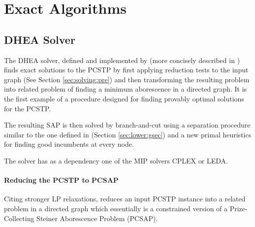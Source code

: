 \clearpage
\section{Exact Algorithms}\label{sec:solving:exact}

\subsection{DHEA Solver}
\label{sec:exact:dhea}
The DHEA solver, defined and implemented
by \citet{ljubic2005solving}
(more concisely described in \citet{ljubic2006algorithmic}) finds exact solutions to the PCSTP
by first applying
reduction tests to the input graph (See Section \ref{sec:solving:pre}) and
then transforming the resulting problem into related problem of finding a minimum
aborescence in a directed graph. It is the first example of a procedure designed for
finding provably optimal solutions for the PCSTP.

The resulting SAP is then solved by branch-and-cut using a separation procedure
similar to the one defined in \citet{lucena2004strong}
(Section \ref{sec:lower:gsec}) and a new primal heuristics for
finding good incumbents at every node.

The solver has as a dependency one of the MIP solvers CPLEX or LEDA.
 \paragraph{Reducing the PCSTP to PCSAP}
 Citing stronger LP relaxations, \citet{ljubic2005solving} reduces an input PCSTP instance
 into a related problem in a directed graph which essentially is a constrained version
 of a Prize-Collecting Steiner Aborescence Problem (PCSAP).


